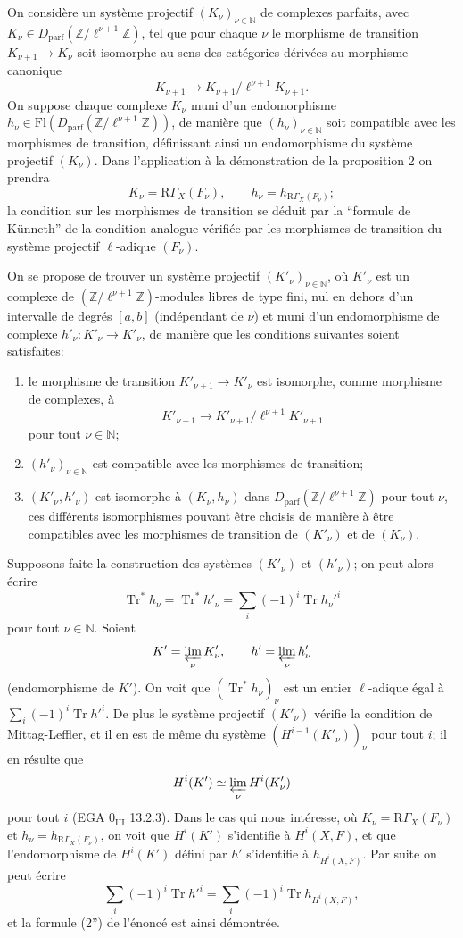 \documentclass[11pt]{article}
\newcommand{\R}{\mathrm{R}}\newcommand{\RHomCore}{\mathrm{RHom}}
\providecommand{\Tr}{\operatorname{Tr}}
\providecommand{\Tr}{\operatorname{Tr}}
\providecommand{\Tr}{\operatorname{Tr}}
\providecommand{\R}{\mathrm R}
\providecommand{\Tr}{\operatorname{Tr}}
\providecommand{\Tr}{\operatorname{Tr}}
\begin{document}
On considère un système projectif $(K_\nu)_{\nu\in\mathbb N}$ de complexes parfaits, avec $K_\nu\in D_{\mathrm{parf}}(\mathbb Z/\ell^{\nu+1}\mathbb Z)$, tel que pour chaque $\nu$ le morphisme de transition $K_{\nu+1}\to K_\nu$ soit isomorphe au sens des catégories dérivées au morphisme canonique
\[
K_{\nu+1}\to K_{\nu+1}/\ell^{\nu+1}K_{\nu+1}.
\]
On suppose chaque complexe $K_\nu$ muni d'un endomorphisme $h_\nu\in\mathrm{Fl}(D_{\mathrm{parf}}(\mathbb Z/\ell^{\nu+1}\mathbb Z))$, de manière que $(h_\nu)_{\nu\in\mathbb N}$ soit compatible avec les morphismes de transition, définissant ainsi un endomorphisme du système projectif $(K_\nu)$. Dans l'application à la démonstration de la proposition 2 on prendra
\[
K_\nu=\R\Gamma_X(F_\nu),\qquad h_\nu=h_{\R\Gamma_X(F_\nu)};
\]
la condition sur les morphismes de transition se déduit par la ``formule de Künneth'' de la condition analogue vérifiée par les morphismes de transition du système projectif $\ell$-adique $(F_\nu)$.

On se propose de trouver un système projectif $(K'_\nu)_{\nu\in\mathbb N}$, où $K'_\nu$ est un complexe de $(\mathbb Z/\ell^{\nu+1}\mathbb Z)$-modules libres de type fini, nul en dehors d'un intervalle de degrés $[a,b]$ (indépendant de $\nu$) et muni d'un endomorphisme de complexe $h'_\nu:K'_\nu\to K'_\nu$, de manière que les conditions suivantes soient satisfaites:
\begin{enumerate}[label=\arabic*)]
\item le morphisme de transition $K'_{\nu+1}\to K'_\nu$ est isomorphe, comme morphisme de complexes, à
\[
K'_{\nu+1}\to K'_{\nu+1}/\ell^{\nu+1}K'_{\nu+1}
\]
pour tout $\nu\in\mathbb N$;
\item $(h'_\nu)_{\nu\in\mathbb N}$ est compatible avec les morphismes de transition;
\item $(K'_\nu,h'_\nu)$ est isomorphe à $(K_\nu,h_\nu)$ dans $D_{\mathrm{parf}}(\mathbb Z/\ell^{\nu+1}\mathbb Z)$ pour tout $\nu$, ces différents isomorphismes pouvant être choisis de manière à être compatibles avec les morphismes de transition de $(K'_\nu)$ et de $(K_\nu)$.
\end{enumerate}
Supposons faite la construction des systèmes $(K'_\nu)$ et $(h'_\nu)$; on peut alors écrire
\[
\Tr^*h_\nu=\Tr^*h'_\nu=\sum_i(-1)^i\Tr h_\nu'^i
\]
pour tout $\nu\in\mathbb N$. Soient
\[
K'=\varprojlim_\nu K'_\nu,
\qquad h'=\varprojlim_\nu h'_\nu
\]
(endomorphisme de $K'$). On voit que $(\Tr^*h_\nu)_\nu$ est un entier $\ell$-adique égal à $\sum_i(-1)^i\Tr h'^i$. De plus le système projectif $(K'_\nu)$ vérifie la condition de Mittag-Leffler, et il en est de même du système $(H^{i-1}(K'_\nu))_\nu$ pour tout $i$; il en résulte que
\[
H^i(K')\simeq\varprojlim_\nu H^i(K'_\nu)
\]
pour tout $i$ (EGA $0_{\mathrm{III}}$ 13.2.3). Dans le cas qui nous intéresse, où $K_\nu=\R\Gamma_X(F_\nu)$ et $h_\nu=h_{\R\Gamma_X(F_\nu)}$, on voit que $H^i(K')$ s'identifie à $H^i(X,F)$, et que l'endomorphisme de $H^i(K')$ défini par $h'$ s'identifie à $h_{H^i(X,F)}$. Par suite on peut écrire
\[
\sum_i(-1)^i\Tr h'^i=
\sum_i(-1)^i\Tr h_{H^i(X,F)},
\]
et la formule (2'') de l'énoncé est ainsi démontrée.
\end{document}
